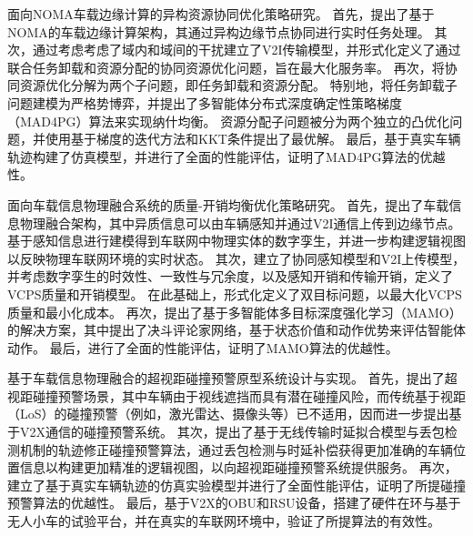 \begin{cabstract}
 面向NOMA车载边缘计算的异构资源协同优化策略研究。
首先，提出了基于NOMA的车载边缘计算架构，其通过异构边缘节点协同进行实时任务处理。
其次，通过考虑考虑了域内和域间的干扰建立了V2I传输模型，并形式化定义了通过联合任务卸载和资源分配的协同资源优化问题，旨在最大化服务率。
再次，将协同资源优化分解为两个子问题，即任务卸载和资源分配。
特别地，将任务卸载子问题建模为严格势博弈，并提出了多智能体分布式深度确定性策略梯度（MAD4PG）算法来实现纳什均衡。
资源分配子问题被分为两个独立的凸优化问题，并使用基于梯度的迭代方法和KKT条件提出了最优解。
最后，基于真实车辆轨迹构建了仿真模型，并进行了全面的性能评估，证明了MAD4PG算法的优越性。

 面向车载信息物理融合系统的质量-开销均衡优化策略研究。
首先，提出了车载信息物理融合架构，其中异质信息可以由车辆感知并通过V2I通信上传到边缘节点。
基于感知信息进行建模得到车联网中物理实体的数字孪生，并进一步构建逻辑视图以反映物理车联网环境的实时状态。
其次，建立了协同感知模型和V2I上传模型，并考虑数字孪生的时效性、一致性与冗余度，以及感知开销和传输开销，定义了VCPS质量和开销模型。
在此基础上，形式化定义了双目标问题，以最大化VCPS质量和最小化成本。
再次，提出了基于多智能体多目标深度强化学习（MAMO）的解决方案，其中提出了决斗评论家网络，基于状态价值和动作优势来评估智能体动作。
最后，进行了全面的性能评估，证明了MAMO算法的优越性。

 基于车载信息物理融合的超视距碰撞预警原型系统设计与实现。
首先，提出了超视距碰撞预警场景，其中车辆由于视线遮挡而具有潜在碰撞风险，而传统基于视距（LoS）的碰撞预警（例如，激光雷达、摄像头等）已不适用，因而进一步提出基于V2X通信的碰撞预警系统。
其次，提出了基于无线传输时延拟合模型与丢包检测机制的轨迹修正碰撞预警算法，通过丢包检测与时延补偿获得更加准确的车辆位置信息以构建更加精准的逻辑视图，以向超视距碰撞预警系统提供服务。
再次，建立了基于真实车辆轨迹的仿真实验模型并进行了全面性能评估，证明了所提碰撞预警算法的优越性。
最后，基于V2X的OBU和RSU设备，搭建了硬件在环与基于无人小车的试验平台，并在真实的车联网环境中，验证了所提算法的有效性。

\end{cabstract}

